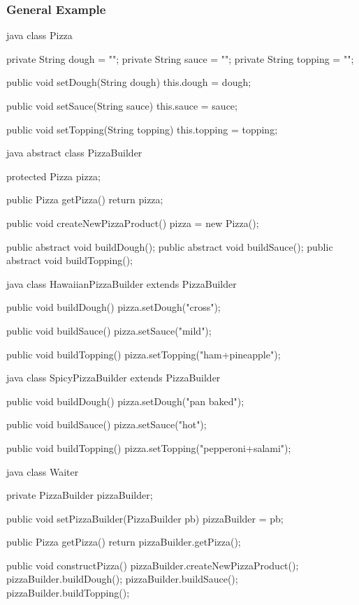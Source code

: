 \subsubsection{General Example}
\label{subsubsec:}
\begin{codeboxNl}[Product]{java}
class Pizza {
    private String dough = "";
    private String sauce = "";
    private String topping = "";

    public void setDough(String dough) {
        this.dough = dough;
    }

    public void setSauce(String sauce) {
        this.sauce = sauce;
    }

    public void setTopping(String topping) {
        this.topping = topping;
    }
}
\end{codeboxNl}
\begin{codeboxNl}{java}
abstract class PizzaBuilder {
    protected Pizza pizza;

    public Pizza getPizza() {
        return pizza;
    }

    public void createNewPizzaProduct() {
        pizza = new Pizza();
    }

    public abstract void buildDough();
    public abstract void buildSauce();
    public abstract void buildTopping();
}
\end{codeboxNl}
\begin{codeboxNl}{java}
class HawaiianPizzaBuilder extends PizzaBuilder {
    public void buildDough() {
        pizza.setDough("cross");
    }

    public void buildSauce() {
        pizza.setSauce("mild");
    }

    public void buildTopping() {
        pizza.setTopping("ham+pineapple");
    }
}

\end{codeboxNl}
\begin{codeboxNl}{java}
class SpicyPizzaBuilder extends PizzaBuilder {
    public void buildDough() {
        pizza.setDough("pan baked");
    }

    public void buildSauce() {
        pizza.setSauce("hot");
    }

    public void buildTopping() {
        pizza.setTopping("pepperoni+salami");
    }
}
\end{codeboxNl}
\begin{codeboxNl}[Director]{java}
class Waiter {
    private PizzaBuilder pizzaBuilder;

    public void setPizzaBuilder(PizzaBuilder pb) {
        pizzaBuilder = pb;
    }

    public Pizza getPizza() {
        return pizzaBuilder.getPizza();
    }

    public void constructPizza() {
        pizzaBuilder.createNewPizzaProduct();
        pizzaBuilder.buildDough();
        pizzaBuilder.buildSauce();
        pizzaBuilder.buildTopping();
    }
}
\end{codeboxNl}
